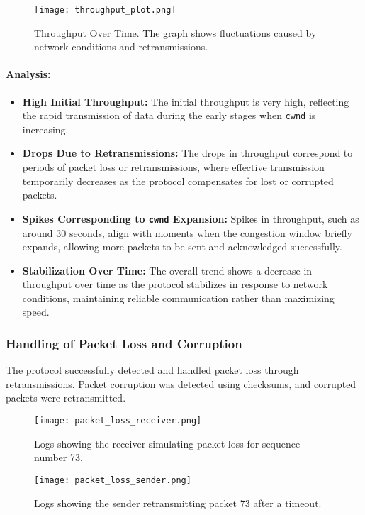 \documentclass[11pt]{article}
\begin{document}
\begin{figure}[H]
    \centering
    \texttt{[image: throughput\_plot.png]}
    \caption{Throughput Over Time. The graph shows fluctuations caused by network conditions and retransmissions.}
    \label{fig:throughput_plot}
\end{figure}

\paragraph{Analysis:}

\begin{itemize}
    \item \textbf{High Initial Throughput:} The initial throughput is very high, reflecting the rapid transmission of data during the early stages when \texttt{cwnd} is increasing.
    \item \textbf{Drops Due to Retransmissions:} The drops in throughput correspond to periods of packet loss or retransmissions, where effective transmission temporarily decreases as the protocol compensates for lost or corrupted packets.
    \item \textbf{Spikes Corresponding to \texttt{cwnd} Expansion:} Spikes in throughput, such as around 30 seconds, align with moments when the congestion window briefly expands, allowing more packets to be sent and acknowledged successfully.
    \item \textbf{Stabilization Over Time:} The overall trend shows a decrease in throughput over time as the protocol stabilizes in response to network conditions, maintaining reliable communication rather than maximizing speed.
\end{itemize}

\subsubsection{Handling of Packet Loss and Corruption}

The protocol successfully detected and handled packet loss through retransmissions. Packet corruption was detected using checksums, and corrupted packets were retransmitted.

\begin{figure}[H]
    \centering
    \texttt{[image: packet\_loss\_receiver.png]}
    \caption{Logs showing the receiver simulating packet loss for sequence number 73.}
    \label{fig:packet_loss_receiver}
\end{figure}
\begin{figure}[H]
    \centering
    \texttt{[image: packet\_loss\_sender.png]}
    \caption{Logs showing the sender retransmitting packet 73 after a timeout.}
    \label{fig:packet_loss_sender}
\end{figure}
\end{document}
